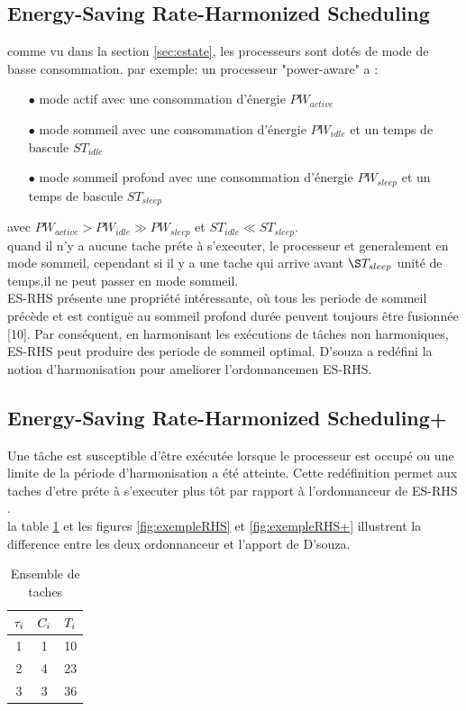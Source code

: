\subsection{Energy-Saving Rate-Harmonized Scheduling}
comme vu dans la section \ref{sec:cstate}, les processeurs sont dotés de mode de basse consommation.
par exemple: un processeur "power-aware" a :
\vspace{0.5cm}
\begin{itemize}
\item[$\bullet$] mode actif avec une consommation d'énergie $PW_{active}$
\item[$\bullet$] mode sommeil avec une consommation d'énergie $PW_{idle}$ et un temps de bascule $ST_{idle}$
\item[$\bullet$] mode sommeil profond avec une consommation d'énergie $PW_{sleep}$ et un temps de bascule $ST_{sleep}$
\end{itemize}
\vspace{0.5cm}
avec $PW_{active} > PW_{idle} \gg PW_{sleep} $ et $ ST_{idle} \ll ST_{sleep}$.
\\ \indent quand il n'y a aucune tache préte à s'executer, le processeur et generalement en mode sommeil, cependant si il  y a une tache qui arrive avant $\S\periode{sleep}$ unité de temps,il ne peut passer en mode sommeil.
\\ \indent ES-RHS présente une propriété intéressante, où tous les periode de sommeil précède et est contiguë au sommeil profond durée peuvent toujours être fusionnée [10]. Par conséquent, en harmonisant
les exécutions de tâches non harmoniques, ES-RHS peut produire des periode de sommeil optimal. D'souza \cite{DAR16} a redéfini la notion d'harmonisation pour ameliorer l'ordonnancemen ES-RHS.
\subsection{Energy-Saving Rate-Harmonized Scheduling+}
\indent Une tâche est susceptible d'être exécutée lorsque le processeur est occupé ou une limite de la période d'harmonisation a été atteinte. Cette redéfinition permet aux taches d'etre préte à s'executer plus tôt par rapport à l'ordonnanceur de ES-RHS \cite{Rowe10}.
\\ la table \ref{tab:exempleRHS} et les figures \ref{fig:exempleRHS} et \ref{fig:exempleRHS+} illustrent la difference entre les deux ordonnanceur et l'apport de D'souza.

\begin{table}[h]
\begin{center}
\begin{tabular}{|c|c|c|}
 \hline$\tau_{i}$ & $C_{i}$ & $T_{i}$ \\ 
 \hline1 & 1 & 10 \\ 
 \hline 2 & 4 & 23 \\ 
 \hline 3 & 3 & 36 \\ 
 \hline 
 \end{tabular}
\end{center}
\caption{Ensemble de taches} \label{tab:exempleRHS}
\end{table}

